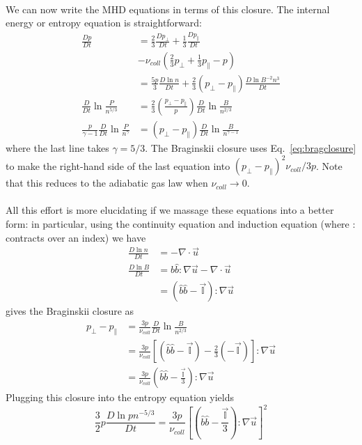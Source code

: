 \\
We can now write the MHD equations in terms of this closure. The internal energy or entropy equation is straightforward:
\begin{align*}
  \frac{Dp}{Dt}&=\frac23\frac{Dp_\perp}{Dt}+\frac13\frac{Dp_\parallel}{Dt}\\
  &-\nu_{coll}\left(\frac23 p_\perp+\frac13p_\parallel-p\right)\\
  &=\frac{5p}{3}\frac{D\ln n}{Dt}+\frac23(p_\perp-p_\parallel)\frac{D\ln B^{-2}n^3}{Dt}\\
  \frac D{Dt}\ln\frac{P}{n^{5/3}}&=\frac23\left(\frac{p_\perp-p_\parallel}p\right)\frac D{Dt}\ln\frac{B}{n^{2/3}}\\
  \frac p{\gamma-1}\frac {D}{Dt}\ln\frac{P}{n^\gamma}&=(p_\perp-p_\parallel)\frac{D}{Dt}\ln\frac{B}{n^{\gamma-1}}
\end{align*}
where the last line takes $\gamma=5/3$. The Braginskii closure uses Eq.~\ref{eq:bragclosure} to make the right-hand side of the last equation into $(p_\perp-p_\parallel)^2\nu_{coll}/3p$. Note that this reduces to the adiabatic gas law when $\nu_{coll}\to0$.\\
\\
All this effort is more elucidating if we massage these equations into a better form: in particular, using the continuity equation and induction equation (where : contracts over an index) we have
\begin{align*}
  \frac{D\ln n}{Dt}&=-\nabla\cdot\vec u\\
  \frac{D\ln B}{Dt}&=\hat b\hat b:\nabla\vec u-\nabla\cdot\vec u\\
  &=(\hat b\hat b-\mathbb{\vec I}):\nabla\vec u
\end{align*}
gives the Braginskii closure as
\begin{align}
  p_\perp-p_\parallel&=\frac{3p}{\nu_{coll}}\frac{D}{Dt}\ln\frac{B}{n^{2/3}}\nonumber\\
  &=\frac{3p}{\nu_{coll}}\left[(\hat b\hat b-\vec{\mathbb{I}})-\frac23(-\vec{\mathbb{I}})\right]:\nabla\vec u\nonumber\\
 &=\frac{3p}{\nu_{coll}}\left(\hat b\hat b-\frac{\vec{\mathbb{I}}}{3}\right):\nabla\vec u \label{eq:bragclos2}
\end{align}
Plugging this closure into the entropy equation yields
\begin{equation*}
  \frac32p\frac{D\ln pn^{-5/3}}{Dt}=\frac{3p}{\nu_{coll}}\left[\left(\hat b\hat b-\frac{\vec{\mathbb{I}}}3\right):\nabla\vec u\right]^2
\end{equation*}
